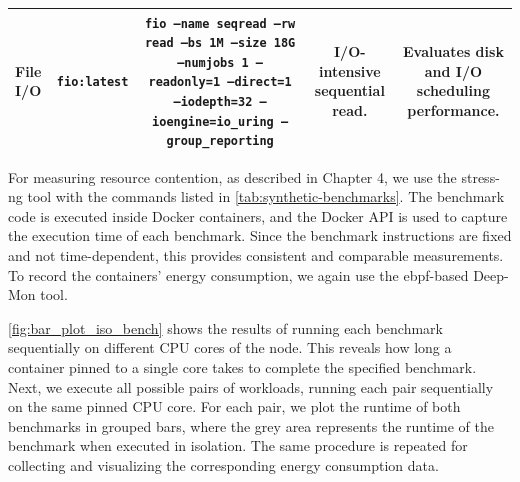 \begin{table}[htbp]
\begin{tabular}{@{}lcccc@{}}
        \textbf{File I/O}                                                                                                                                 &
        \texttt{fio:latest}                                                                                                                               &
        \texttt{fio --name seqread --rw read --bs 1M --size 18G --numjobs 1 --readonly=1 --direct=1 --iodepth=32 --ioengine=io\_uring --group\_reporting} &
        I/O-intensive sequential read.                                                                                                                    &
        Evaluates disk and I/O scheduling performance.                                                                                                                                                                                                         \\
        \bottomrule
    \end{tabular}
\end{table}

For measuring resource contention, as described in Chapter 4, we use the stress-ng tool with the commands listed in \ref{tab:synthetic-benchmarks}. The benchmark code is executed inside Docker containers, and the Docker API is used to capture the execution time of each benchmark. Since the benchmark instructions are fixed and not time-dependent, this provides consistent and comparable measurements. To record the containers’ energy consumption, we again use the ebpf-based Deep-Mon tool.

\ref{fig:bar_plot_iso_bench} shows the results of running each benchmark sequentially on different CPU cores of the node. This reveals how long a container pinned to a single core takes to complete the specified benchmark. Next, we execute all possible pairs of workloads, running each pair sequentially on the same pinned CPU core. For each pair, we plot the runtime of both benchmarks in grouped bars, where the grey area represents the runtime of the benchmark when executed in isolation. The same procedure is repeated for collecting and visualizing the corresponding energy consumption data.



